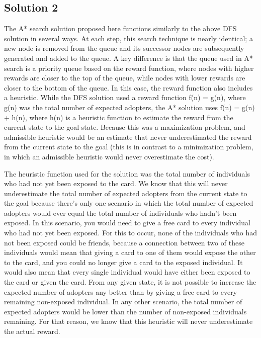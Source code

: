 \documentclass[11pt,journal]{IEEEtran}
\begin{document}
\subsection{Solution 2}
The A* search solution proposed here functions similarly to the above DFS solution in several ways. At each step, this search technique is nearly identical; a new node is removed from the queue and its successor nodes are subsequently generated and added to the queue. A key difference is that the queue used in A* search is a priority queue based on the reward function, where nodes with higher rewards are closer to the top of the queue, while nodes with lower rewards are closer to the bottom of the queue. In this case, the reward function also includes a heuristic. While the DFS solution used a reward function f(n) = g(n), where g(n) was the total number of expected adopters, the A* solution uses f(n) = g(n) + h(n), where h(n) is a heuristic function to estimate the reward from the current state to the goal state. Because this was a maximization problem, and admissible heuristic would be an estimate that never underestimated the reward from the current state to the goal (this is in contrast to a minimization problem, in which an admissible heuristic would never overestimate the cost).

The heuristic function used for the solution was the total number of individuals who had not yet been exposed to the card. We know that this will never underestimate the total number of expected adopters from the current state to the goal because there's only one scenario in which the total number of expected adopters would ever equal the total number of individuals who hadn't been exposed. In this scenario, you would need to give a free card to every individual who had not yet been exposed. For this to occur, none of the individuals who had not been exposed could be friends, because a connection between two of these individuals would mean that giving a card to one of them would expose the other to the card, and you could no longer give a card to the exposed individual. It would also mean that every single individual would have either been exposed to the card or given the card. From any given state, it is not possible to increase the expected number of adopters any better than by giving a free card to every remaining non-exposed individual. In any other scenario, the total number of expected adopters would be lower than the number of non-exposed individuals remaining. For that reason, we know that this heuristic will never underestimate the actual reward.
\end{document}
